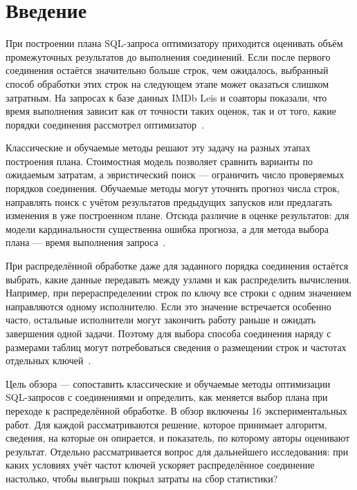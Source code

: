 \documentclass[a4paper, final]{article}
\begin{document}
	
	\newpage
	\section*{Введение}
	
	При построении плана SQL-запроса оптимизатору приходится оценивать объём промежуточных результатов до выполнения соединений. Если после первого соединения остаётся значительно больше строк, чем ожидалось, выбранный способ обработки этих строк на следующем этапе может оказаться слишком затратным. На запросах к базе данных IMDb Leis и соавторы показали, что время выполнения зависит как от точности таких оценок, так и от того, какие порядки соединения рассмотрел оптимизатор~\cite{leis2015}.
	
	Классические и обучаемые методы решают эту задачу на разных этапах построения плана. Стоимостная модель позволяет сравнить варианты по ожидаемым затратам, а эвристический поиск --- ограничить число проверяемых порядков соединения. Обучаемые методы могут уточнять прогноз числа строк, направлять поиск с учётом результатов предыдущих запусков или предлагать изменения в уже построенном плане. Отсюда различие в оценке результатов: для модели кардинальности существенна ошибка прогноза, а для метода выбора плана --- время выполнения запроса~\cite{manegold2000,goncalves2014,wang2024,autoquo2024,foss2024}.
	
	При распределённой обработке даже для заданного порядка соединения остаётся выбрать, какие данные передавать между узлами и как распределить вычисления. Например, при перераспределении строк по ключу все строки с одним значением направляются одному исполнителю. Если это значение встречается особенно часто, остальные исполнители могут закончить работу раньше и ожидать завершения одной задачи. Поэтому для выбора способа соединения наряду с размерами таблиц могут потребоваться сведения о размещении строк и частотах отдельных ключей~\cite{liang2024,prpq2017,flowjoin2026}.
	
	Цель обзора --- сопоставить классические и обучаемые методы оптимизации SQL-запросов с соединениями и определить, как меняется выбор плана при переходе к распределённой обработке. В обзор включены 16 экспериментальных работ. Для каждой рассматриваются решение, которое принимает алгоритм, сведения, на которые он опирается, и показатель, по которому авторы оценивают результат. Отдельно рассматривается вопрос для дальнейшего исследования: при каких условиях учёт частот ключей ускоряет распределённое соединение настолько, чтобы выигрыш покрыл затраты на сбор статистики?
	
\end{document}
